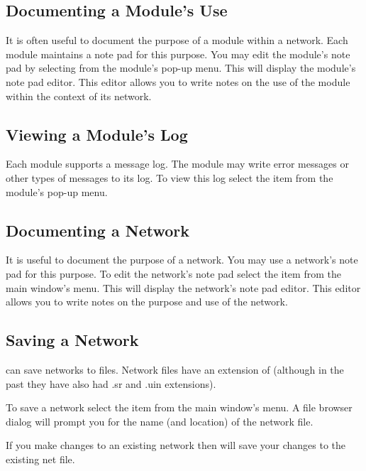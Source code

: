 \subsection{Documenting a Module's Use}
\label{sec:docmodule}

It is often useful to document the purpose of a module within a network.
Each module maintains a note pad for this purpose.  You may edit the
module's note pad by selecting  from the module's
pop-up menu.  This will display the module's note pad editor.  This 
editor allows you to write notes on the use of the
module within the context of its network.

\subsection{Viewing a Module's Log}
\label{sec:viewmodslog}

Each module supports a message log.  The module may write error messages or
other types of messages to its log.  To view this log select the
 item from the module's pop-up menu.

\subsection{Documenting a Network}
\label{sec:}

It is useful to document the purpose of a network.  You may use a network's
note pad for this purpose.  To edit the network's note pad select the
 item from the main window's  menu.  This
will display the network's note pad editor.  This editor allows you
to write notes on the purpose and use of the network.


\subsection{Saving a Network}
\label{sec:savenet}

\sr{} can save networks to files.  Network files have an extension of
 (although in the past they have also had .sr and .uin
extensions).  

To save a network select the  item from the main window's
 menu.  A file browser dialog will prompt you for the
name (and location) of the network file.

If you make changes to an existing network then  will
save your changes to the existing net file.

